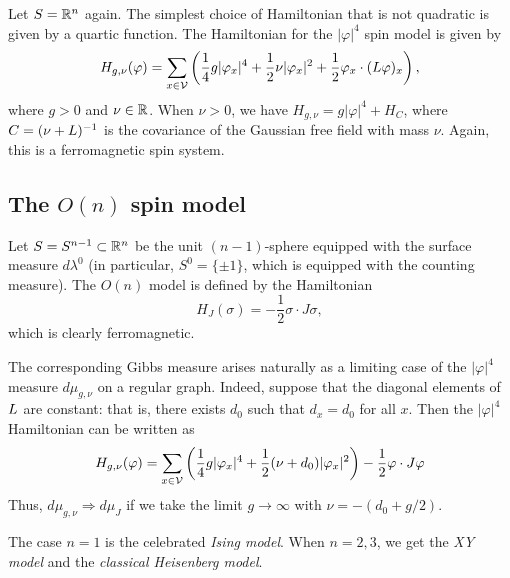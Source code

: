 Let $S = {\mathbb R}^n$ again.
The simplest choice of Hamiltonian that is not quadratic is given by a quartic function.
The Hamiltonian for the $|\varphi|^4$ spin model is given by
\begin{equation}
H_{g,\nu}(\varphi)
  =
\sum_{x\in\mathcal{V}}
\left(
  \frac{1}{4} g |\varphi_x|^4
    +
  \frac{1}{2} \nu |\varphi_x|^2
    +
  \frac{1}{2} \varphi_x \cdot (L \varphi)_x
\right),
\end{equation}
where $g > 0$ and $\nu\in{\mathbb R}$. When $\nu > 0$, we have $H_{g,\nu} = g |\varphi|^4 + H_C$,
where $C = (\nu + L)^{-1}$ is the covariance of the Gaussian free field with mass $\nu$.
Again, this is a ferromagnetic spin system.


\subsection{The \texorpdfstring{$O(n)$}{O(n)} spin model}

Let $S = S^{n-1} \subset {\mathbb R}^n$ be the unit $(n-1)$-sphere equipped with the surface measure
$d\lambda^0$ (in particular, $S^0 = \{ \pm 1 \}$, which is equipped with the counting measure).
The $O(n)$ model is defined by the Hamiltonian
\begin{equation}
H_J(\sigma) = -\frac{1}{2} \sigma \cdot J \sigma,
\end{equation}
which is clearly ferromagnetic.

The corresponding Gibbs measure arises naturally as a limiting case of the $|\varphi|^4$
measure $d\mu_{g,\nu}$ on a regular graph.
Indeed, suppose that the diagonal elements of $L$ are
constant: that is, there exists $d_0$ such that $d_x = d_0$ for all $x$.
Then the $|\varphi|^4$ Hamiltonian can be written as
\begin{equation}
H_{g,\nu}(\varphi)
  =
\sum_{x\in\mathcal{V}}
\left(
  \frac{1}{4} g |\varphi_x|^4
    +
  \frac{1}{2} (\nu + d_0) |\varphi_x|^2
\right)
  -
\frac{1}{2} \varphi \cdot J \varphi
\end{equation}
Thus, $d\mu_{g,\nu} \Rightarrow d\mu_J$
if we take the limit $g\to\infty$ with $\nu = -(d_0 + g / 2)$.

The case $n = 1$ is the celebrated \emph{Ising model}. When $n = 2, 3$,
we get the \emph{XY model} and the \emph{classical Heisenberg model}.


